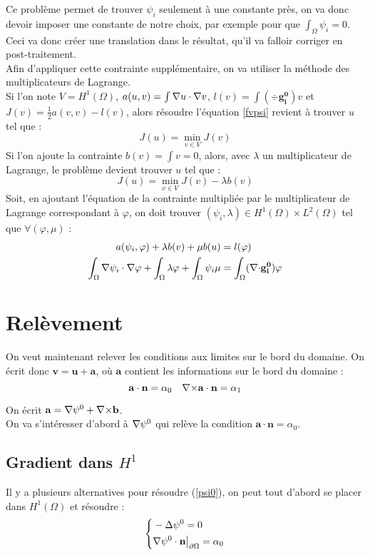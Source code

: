 Ce problème permet de trouver $\psi_i$ seulement à une constante près, on va donc devoir imposer une constante de notre choix, par exemple pour que $\int_\Omega \psi_i = 0$. Ceci va donc créer une translation dans le résultat, qu'il va falloir corriger en post-traitement.\\
Afin d'appliquer cette contrainte supplémentaire, on va utiliser la méthode des multiplicateurs de Lagrange.\\
Si l'on note $V=H^1(\Omega)$, $a(u,v)=\int {\nabla} u \cdot {\nabla} v$, $l(v)=\int (\div \mathbf{g_i^0})v$ et $J(v)=\frac{1}{2}a(v,v)-l(v)$, alors résoudre l'équation \ref{fvpsi} revient à trouver $u$ tel que :
\[ J(u) = \min_{v\in V} J(v) \]
Si l'on ajoute la contrainte $b(v) = \int v = 0$, alors, avec $\lambda$ un multiplicateur de Lagrange, le problème devient trouver $u$ tel que :
\[ J(u) = \min_{v\in V} J(v) - \lambda b(v) \]
Soit, en ajoutant l'équation de la contrainte multipliée par le multiplicateur de Lagrange correspondant à $\varphi$, on doit trouver $(\psi_i,\lambda)\in H^1(\Omega)\times L^2(\Omega)$ tel que $\forall (\varphi,\mu)$ :
\begin{align}\label{fvpsiml}
a(\psi_i,\varphi) + \lambda b(v) + \mu b(u) &= l(\varphi) \notag \\
\int_\Omega {\nabla}\psi_i\cdot{\nabla}\varphi + \int_\Omega \lambda\varphi + \int_\Omega \psi_i\mu &= \int_\Omega ({\nabla\cdot} \mathbf{g_i^0})\varphi
\end{align}
\section{Relèvement}
\label{relev}
On veut maintenant relever les conditions aux limites sur le bord du domaine. On écrit donc $\mathbf{v}=\mathbf{u}+\mathbf{a}$, où $\mathbf{a}$ contient les informations sur le bord du domaine :
\[ \mathbf{a}\cdot\mathbf{n}=\alpha_0\quad {\nabla\times}\mathbf{a}\cdot\mathbf{n}=\alpha_1 \]

On écrit $\mathbf{a}={\nabla}\psi^0 + {\nabla\times}\mathbf{b}$.\\
On va s'intéresser d'abord à ${\nabla}\psi^0$ qui relève la condition $\mathbf{a}\cdot\mathbf{n}=\alpha_0$.\\

\subsection{Gradient dans $H^1$}
\label{secpsi0hdiv} \label{multLagrange}
Il y a plusieurs alternatives pour résoudre (\ref{psi0}), on peut tout d'abord se placer dans $H^1(\Omega)$ et résoudre :
\begin{equation}\label{pbpsi0}
\left\{\begin{aligned}
&-{\Delta}\psi^0 = 0\\
&{\nabla}\psi^0\cdot \mathbf{n}{\big\rvert_{\partial\Omega}}=\alpha_0
\end{aligned}\right.
\end{equation}

